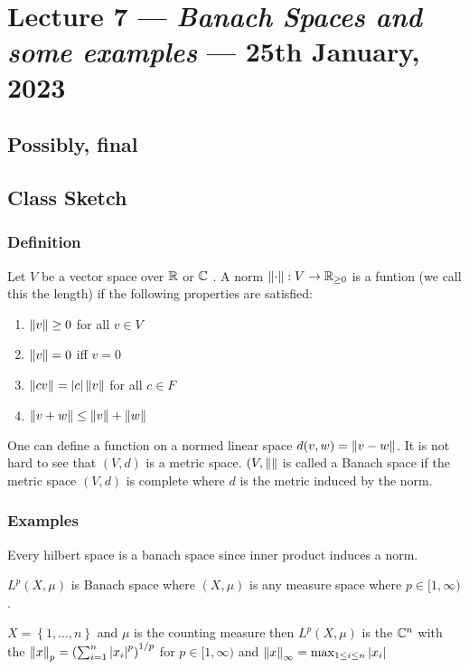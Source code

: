 \section{Lecture 7 --- \textit{Banach Spaces and some examples} --- 25th January, 2023}
\horz
\subsection{Possibly, final}

\horz

\subsection{Class Sketch}
\horz

\subsubsection{Definition}
Let $V$ be a vector space over $\mathbb R$ or $\mathbb C$ . A norm $\left\lVert  \cdot  \right\rVert : V \to \mathbb R _{\ge 0}$ is a funtion (we call this the length) if the following properties are satisfied:
\begin{enumerate}
    \item $\left\lVert v \right\rVert \ge 0$ for all $v\in V$
    \item $\left\lVert v \right\rVert = 0$ iff $v=0$
    \item $\left\lVert cv \right\rVert = \left\lvert c \right\rvert\left\lVert v \right\rVert$ for all $c\in F$
    \item $\left\lVert v+w \right\rVert \le \left\lVert v \right\rVert + \left\lVert w \right\rVert$
\end{enumerate}

One can define a function on a normed linear space $d(v,w) = \left\lVert v-w \right\rVert$. It is not hard to see that $(V,d)$ is a metric space. $(V, \left\lVert  \right\rVert$ is called a Banach space if the metric space $(V,d)$ is complete where $d$ is the metric induced by the norm.
    

    \subsubsection{Examples}
    Every hilbert space is a banach space since inner product induces a norm.


    $L^{p} \left( X,\mu \right)$ is Banach space where $(X, \mu)$ is any measure space where $p\in [1,\infty)$.

    $X= \left\{ 1,\ldots , n \right\}$ and $\mu$ is the counting measure then $L^{p} \left( X, \mu \right)$ is the $\mathbb C ^{n}$ with the $\left\lVert x \right\rVert_{p} = \left( \sum_{i=1} ^{n} \left\lvert x_{i} \right\rvert^{p} \right) ^{1/p}$ for $p\in [1, \infty)$ and $\left\lVert x \right\rVert_{\infty} = \max_{1\le i \le n} \left\lvert x_{i} \right\rvert$


